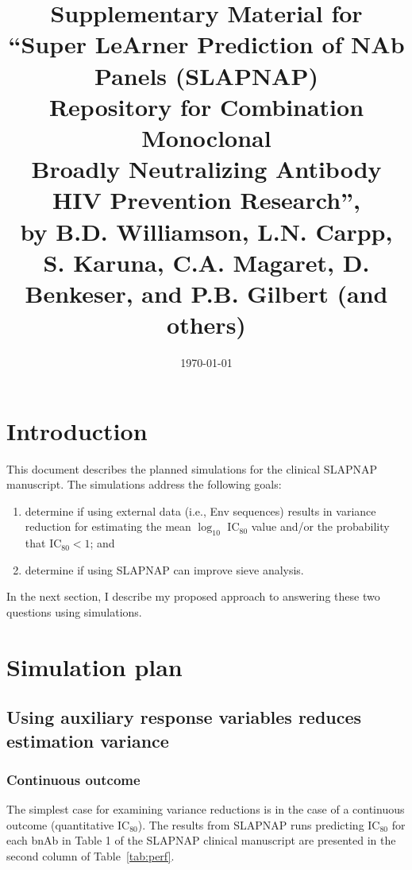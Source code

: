 \documentclass[10pt]{article}
\title{Supplementary Material for \\
``Super LeArner Prediction of NAb Panels (SLAPNAP) \\ Repository for Combination Monoclonal \\
Broadly Neutralizing Antibody HIV Prevention Research'', \\
by B.D. Williamson, L.N. Carpp, S. Karuna, C.A. Magaret, D. Benkeser, and P.B. Gilbert (and others)}
\date{\today}
\begin{document}
\maketitle

\section{Introduction}

This document describes the planned simulations for the clinical SLAPNAP manuscript. The simulations address the following goals:
\begin{enumerate}
    \item determine if using external data (i.e., Env sequences) results in variance reduction for estimating the mean $\log_{10}$ IC$_{80}$ value and/or the probability that IC$_{80} < 1$; and
    \item determine if using SLAPNAP can improve sieve analysis.
\end{enumerate}
In the next section, I describe my proposed approach to answering these two questions using simulations.

\section{Simulation plan}
\subsection{Using auxiliary response variables reduces estimation variance}
\subsubsection{Continuous outcome}
The simplest case for examining variance reductions is in the case of a continuous outcome (quantitative IC$_{80}$). The results from SLAPNAP runs predicting IC$_{80}$ for each bnAb in Table 1 of the SLAPNAP clinical manuscript are presented in the second column of Table~\ref{tab:perf}.
\end{document}
